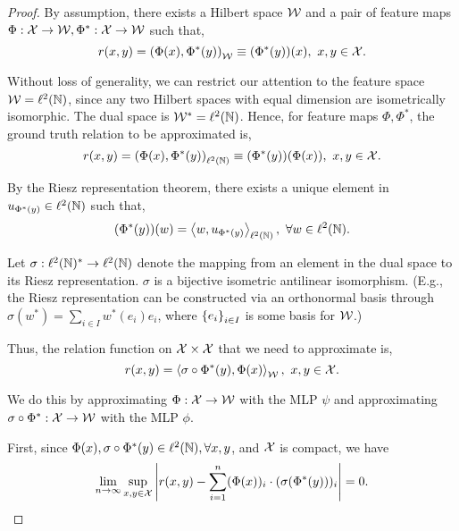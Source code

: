 \begin{proof}
    By assumption, there exists a Hilbert space ${\mathcal{W}}$ and a pair of feature maps $\Phi: {\mathcal{X}} \to {\mathcal{W}}, \Phi^*: {\mathcal{X}} \to {\mathcal{W}}$ such that,
    \begin{equation*}
        r(x, y) = \paren{\Phi(x), \Phi^*(y)}_{\calW} \equiv (\Phi^*(y))(x), \ x, y \in \calX.
    \end{equation*}

    Without loss of generality, we can restrict our attention to the feature space ${\mathcal{W}} = \ell^2({\mathbb{N}})$, since any two Hilbert spaces with equal dimension are isometrically isomorphic. The dual space is ${\mathcal{W}}^* = \ell^2({\mathbb{N}})$. Hence, for feature maps $\Phi, \Phi^*$, the ground truth relation to be approximated is,
    \begin{equation*}
        r(x, y) = \paren{\Phi(x), \Phi^*(y)}_{\ell^2(\bbN)} \equiv (\Phi^*(y))(\Phi(x)), \ x, y \in \calX.
    \end{equation*}

    By the Riesz representation theorem, there exists a unique element in $u_{\Phi^*(y)} \in \ell^2({\mathbb{N}})$ such that,
    \begin{equation*}
        (\Phi^*(y))(w) = \iprod{w}{u_{\Phi^*(y)}}_{\ell^2(\bbN)}, \ \forall w \in \ell^2(\bbN).
    \end{equation*}

    Let $\sigma: \ell^2({\mathbb{N}})^* \to \ell^2({\mathbb{N}})$ denote the mapping from an element in the dual space to its Riesz representation. $\sigma$ is a bijective isometric antilinear isomorphism. (E.g., the Riesz representation can be constructed via an orthonormal basis through $\sigma(w^*) = \sum_{i \in I} w^{*}(e_i) e_i$, where $\left\{e_i\right\}_{i \in I}$ is some basis for ${\mathcal{W}}$.)

    Thus, the relation function on ${\mathcal{X}} \times {\mathcal{X}}$ that we need to approximate is,
    \begin{equation*}
        r(x, y) = \iprod{\sigma \circ \Phi^* (y)}{\Phi(x)}_{\calW}, \ x, y \in \calX.
    \end{equation*}

    We do this by approximating $\Phi: {\mathcal{X}} \to {\mathcal{W}}$ with the MLP $\psi$ and approximating $\sigma \circ \Phi^*: {\mathcal{X}} \to {\mathcal{W}}$ with the MLP $\phi$.

    First, since $\Phi(x), \sigma \circ \Phi^*(y) \in \ell^2({\mathbb{N}}), \forall x, y$, and ${\mathcal{X}}$ is compact, we have
    \begin{equation*}
        \lim_{n \to \infty} \sup_{x,y \in \calX} \abs{r(x, y) - \sum_{i=1}^{n} (\Phi(x))_i \cdot (\sigma(\Phi^*(y)))_i} = 0.
    \end{equation*}


\end{proof}
